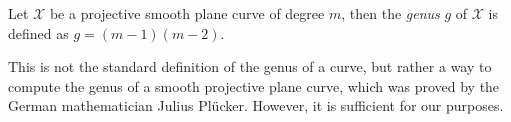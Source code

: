 
\begin{definition}
  Let $\mathcal{X}$ be a projective smooth plane curve of degree $m$, then the \textit{genus} $g$ of $\mathcal{X}$ is defined as $g = (m - 1)(m - 2)$.
\end{definition}
This is not the standard definition of the genus of a curve, but rather a way to compute the genus of a smooth projective plane curve, which was proved by the German mathematician Julius Plücker. However, it is sufficient for our purposes.

